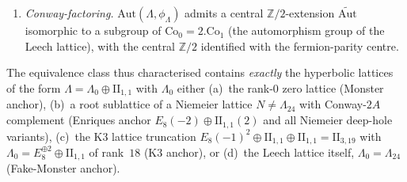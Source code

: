 \begin{theorem}
\begin{enumerate}[label=\textup{(C\arabic*)}]
pseudoscalar anomaly $S^{\mathrm{ps}}(\Lambda)$; the class in
$H^4(\mathrm{B\,Spin}(\Lambda), \Z)$ computing the anomaly of the
chiral fermion on $\Lambda$-target space; vanishes:
$S^{\mathrm{ps}}(\Lambda) = 0$. Equivalently, the rank-$n+1$
hyperbolic lattice $\Lambda$ admits an $\mathrm{Spin}^c$-structure
compatible with the fermion-parity $(-1)^F$
and the Atkin--Lehner Fricke involution $w_1$, so the
Gritsenko--Nikulin multiplier system on $\Lambda$ is
$\iota$-extendable.
\item \emph{Conway-factoring.} $\mathrm{Aut}(\Lambda, \phi_\Lambda)$
admits a central $\mathbb{Z}/2$-extension $\widetilde{\mathrm{Aut}}$
isomorphic to a subgroup of $\mathrm{Co}_0 = 2.\mathrm{Co}_1$ (the
automorphism group of the Leech lattice), with the central
$\mathbb{Z}/2$ identified with the fermion-parity centre.
\end{enumerate}
The equivalence class thus characterised contains \emph{exactly} the
hyperbolic lattices of the form
$\Lambda = \Lambda_0 \oplus \mathrm{II}_{1,1}$ with $\Lambda_0$ either
(a)~the rank-$0$ zero lattice (Monster anchor), (b)~a root sublattice
of a Niemeier lattice $N \neq \Lambda_{24}$ with Conway-$2A$
complement (Enriques anchor $E_8(-2)\oplus\mathrm{II}_{1,1}(2)$ and
all Niemeier deep-hole variants), (c)~the K3 lattice truncation
$E_8(-1)^2\oplus\mathrm{II}_{1,1}\oplus\mathrm{II}_{1,1} = \mathrm{II}_{3,19}$
with $\Lambda_0 = E_8^{\oplus 2}\oplus\mathrm{II}_{1,1}$ of rank~$18$
(K3 anchor), or (d)~the Leech lattice itself,
$\Lambda_0 = \Lambda_{24}$ (Fake-Monster anchor).
\end{theorem}


